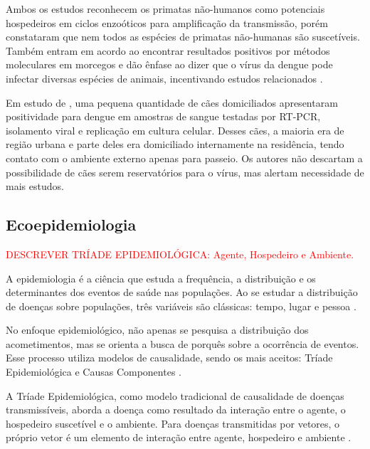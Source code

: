 \indent Ambos os estudos reconhecem os primatas não-humanos como potenciais hospedeiros em ciclos enzoóticos para amplificação da transmissão, porém constataram que nem todos as espécies de primatas não-humanas são suscetíveis. Também entram em acordo ao encontrar resultados positivos por métodos moleculares em morcegos e dão ênfase ao dizer que o vírus da dengue pode infectar diversas espécies de animais, incentivando estudos relacionados \cite{Aldana2024DengueAnimals, Dengue_Animals_Gwee_2021}.

\indent Em estudo de , uma pequena quantidade de cães domiciliados apresentaram positividade para dengue em amostras de sangue testadas por RT-PCR, isolamento viral e replicação em cultura celular. Desses cães, a maioria era de região urbana e parte deles era domiciliado internamente na residência, tendo contato com o ambiente externo apenas para passeio. Os autores não descartam a possibilidade de cães serem reservatórios para o vírus, mas alertam necessidade de mais estudos.

\subsection{Ecoepidemiologia}

\indent \textcolor{red}{DESCREVER TRÍADE EPIDEMIOLÓGICA: Agente, Hospedeiro e Ambiente.}

\indent A epidemiologia é a ciência que estuda a frequência, a distribuição e os determinantes dos eventos de saúde nas populações. Ao se estudar a distribuição de doenças sobre populações, três variáveis são clássicas: tempo, lugar e pessoa \cite{MOPECE2010}.

\indent No enfoque epidemiológico, não apenas se pesquisa a distribuição dos acometimentos, mas se orienta a busca de porquês sobre a ocorrência de eventos. Esse processo utiliza modelos de causalidade, sendo os mais aceitos: Tríade Epidemiológica e Causas Componentes \cite{MOPECE2010}.

\indent A Tríade Epidemiológica, como modelo tradicional de causalidade de doenças transmissíveis, aborda a doença como resultado da interação entre o agente, o hospedeiro suscetível e o ambiente. Para doenças transmitidas por vetores, o próprio vetor é um elemento de interação entre agente, hospedeiro e ambiente \cite{MOPECE2010}. 


